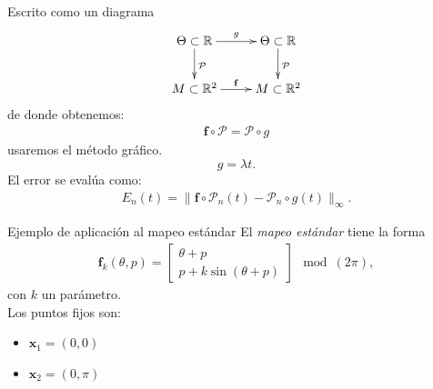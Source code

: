 \documentclass[11pt]{beamer}
\theoremstyle{definition}
\begin{document}
\begin{frame}
Escrito como un diagrama
\begin{eqnarray}
\xymatrix{
\Theta\subset\mathbb{R} \ar[d]^{\mathcal{P}} \ar[r]^{g} & \Theta\subset\mathbb{R} \ar[d]^{\mathcal{P}} \\
M\subset\mathbb{R}^{2} \ar[r]^{\mathbf{f}} & M\subset\mathbb{R}^{2}
}\label{conmutativo}
\end{eqnarray}
de donde obtenemos:
\begin{eqnarray}
\mathbf{f} \circ \mathcal{P} =\mathcal{P}  \circ g
\label{Ecua de invariancia}
\end{eqnarray}
usaremos el m\'etodo gr\'afico.
\begin{equation}
g=\lambda t.
\end{equation}
El error se evalúa como:
\begin{eqnarray}
E_{n}(t) = \parallel \mathbf{f} \circ \mathcal{P}_{n}(t) - \mathcal{P}_{n} \circ g(t) \parallel_{\infty}.  \label{Ecua de invariancia resta}
\end{eqnarray}
\end{frame}




\begin{frame}{Ejemplo de aplicaci\'on al mapeo est\'andar}
El \textit{mapeo estándar} tiene la forma
\begin{eqnarray}
\mathbf{f}_{k}(\theta,p) = \left[\begin{array}{c}
\theta + p \\
p + k\sin(\theta +p)
\end{array}\right] \mod(2\pi),  \label{mapeo estandar}
\end{eqnarray}
con $k$ un parámetro. \\
Los puntos fijos son:
\begin{itemize}
\item $\mathbf{x}_{1}=(0,0)$
\item $\mathbf{x}_{2}=(0,\pi)$
\end{itemize}

\end{frame}
\end{document}
